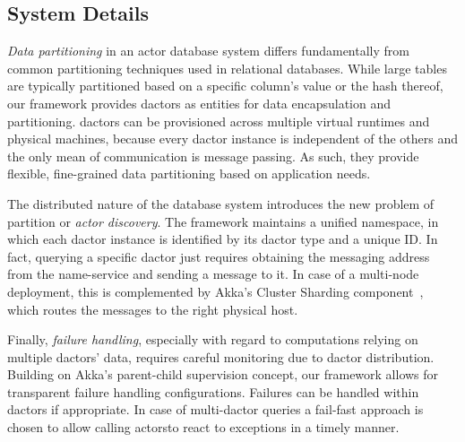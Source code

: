     \subsection{System Details}\label{subsec:framework_discussion}
      \emph{Data partitioning} in an actor database system differs fundamentally from common partitioning techniques used in relational databases.
      While large tables are typically partitioned based on a specific column's value or the hash thereof, our framework provides \glspl{dactor} as entities for data encapsulation and partitioning.
      \Glspl{dactor} can be provisioned across multiple virtual runtimes and physical machines, because every \gls{dactor} instance is independent of the others and the only mean of communication is message passing.
      As such, they provide flexible, fine-grained data partitioning based on application needs.
      
      The distributed nature of the database system introduces the new problem of partition or \emph{actor discovery}.
      The framework maintains a unified namespace, in which each \gls{dactor} instance is identified by its \gls{dactor} type and a unique ID.
      In fact, querying a specific \gls{dactor} just requires obtaining the messaging address from the name-service and sending a message to it.
      In case of a multi-node deployment, this is complemented by Akka's Cluster Sharding component~\cite{akka:clustersharding}, which routes the messages to the right physical host.
      
      Finally, \emph{failure handling}, especially with regard to computations relying on multiple \glspl{dactor}' data, requires careful monitoring due to \gls{dactor} distribution.
      Building on Akka's parent-child supervision concept, our framework allows for transparent failure handling configurations.
      Failures can be handled within \glspl{dactor} if appropriate.
      In case of multi-\gls{dactor} queries a fail-fast approach is chosen to allow calling actorsto react to exceptions in a timely manner.
